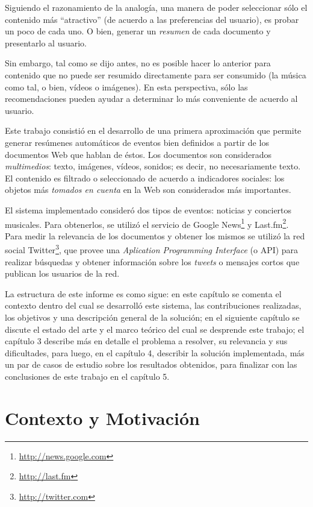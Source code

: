 \documentclass[upright, contnum]{umemoria}
\begin{document}
  Siguiendo el razonamiento de la analogía, una manera de poder
  seleccionar sólo el contenido más ``atractivo'' (de acuerdo a las
  preferencias del usuario), es probar un poco de cada uno. O bien,
  generar un \emph{resumen} de cada documento y presentarlo al usuario.

  Sin embargo, tal como se dijo antes, no es posible hacer lo anterior
  para contenido que no puede ser resumido directamente para ser
  consumido (la música como tal, o bien, vídeos o imágenes). En esta
  perspectiva, sólo las recomendaciones pueden ayudar a determinar lo
  más conveniente de acuerdo al usuario.

  Este trabajo consistió en el desarrollo de una primera aproximación
  que permite generar resúmenes automáticos de eventos bien definidos
  a partir de los documentos Web que hablan de éstos. Los documentos son
  considerados \emph{multimedios}: texto, imágenes, vídeos, sonidos; es
  decir, no necesariamente texto. El contenido es filtrado o
  seleccionado de acuerdo a indicadores sociales: los objetos más
  \emph{tomados en cuenta} en la Web son considerados más importantes.
  
  El sistema implementado consideró dos tipos de eventos: noticias y
  conciertos musicales. Para obtenerlos, se utilizó el servicio de
  Google News\footnote{\href{http://news.google.com}{http://news.google.com} } y
  Last.fm\footnote{\href{http://last.fm}{http://last.fm} }. Para medir la relevancia de los
  documentos y obtener los mismos se utilizó la red social
  Twitter\footnote{\href{http://twitter.com}{http://twitter.com} }, que provee una 
  \emph{Aplication Programming Interface} (o API) para realizar búsquedas y
  obtener información sobre los \emph{tweets} o mensajes cortos que publican
  los usuarios de la red.

  La estructura de este informe es como sigue: en este capítulo se
  comenta el contexto dentro del cual se desarrolló este sistema, las
  contribuciones realizadas, los objetivos y una descripción general
  de la solución; en el siguiente capítulo se discute el estado del
  arte y el marco teórico del cual se desprende este trabajo; el
  capítulo 3 describe más en detalle el problema a resolver, su
  relevancia y sus dificultades, para luego, en el
  capítulo 4, describir la solución implementada, más un par de casos
  de estudio sobre los resultados obtenidos, para finalizar con las
  conclusiones de este trabajo en el capítulo 5.

\section{Contexto y Motivación}
\label{sec-1.1}
\end{document}

